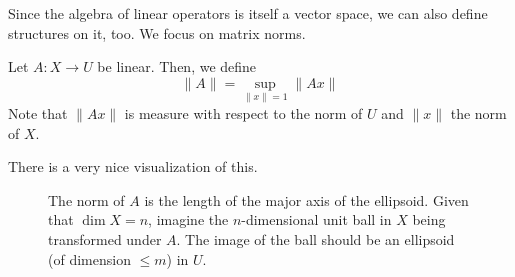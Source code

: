   Since the algebra of linear operators is itself a vector space, we can also define structures on it, too. We focus on matrix norms. 

  \begin{definition}
    Let $A: X \longrightarrow U$ be linear. Then, we define
    \begin{equation}
      \|A\| = \sup_{\|x\|=1} \|A x\|
    \end{equation}
    Note that $\|A x\|$ is measure with respect to the norm of $U$ and $\|x\|$ the norm of $X$. 
  \end{definition}

  There is a very nice visualization of this. 

  \begin{figure}[H]
    \centering 
    \caption{The norm of $A$ is the length of the major axis of the ellipsoid. Given that $\dim{X}=n$, imagine the $n$-dimensional unit ball in $X$ being transformed under $A$. The image of the ball should be an ellipsoid (of dimension $\leq m$) in $U$. } 
    \label{fig:operator_norm}
  \end{figure}

